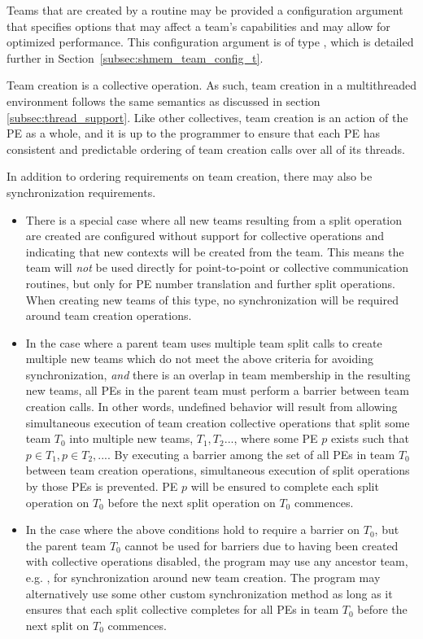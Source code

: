 Teams that are created by a  routine may be
provided a configuration argument that specifies options that may affect
a team's capabilities and may allow for optimized performance.
This configuration argument is of type , which
is detailed further in Section~\ref{subsec:shmem_team_config_t}.

Team creation is a collective operation. As such, team creation in a
multithreaded environment follows the same semantics as discussed in section
\ref{subsec:thread_support}. Like other collectives, team creation is an action
of the \ac{PE} as a whole, and it is up to the programmer to ensure that each
\ac{PE} has consistent and predictable ordering of team creation calls over
all of its threads.

In addition to ordering requirements on team creation, there may also be
synchronization requirements.
\begin{itemize}
\item There is a special case where all new teams resulting from a split operation are
created are configured without support for collective operations and indicating that  new contexts will be created from the team.
This means the team will \emph{not} be used
directly for point-to-point or collective communication routines, but only for
\ac{PE} number translation and further split operations. When creating new teams
of this type, no synchronization will be required around team creation operations.
\item In the case where a parent team uses multiple team split calls to create
multiple new teams which do not meet the above criteria for avoiding synchronization,
\emph{and} there is an overlap in team membership in the resulting new teams, all \acp{PE}
in the parent team must perform a barrier between team creation calls.
In other words, undefined behavior will result from allowing simultaneous execution of team
creation collective operations that split some team $T_0$ into multiple new
teams, $T_1, T_2...$, where some \ac{PE} $p$ exists such that $p \in T_1, p \in T_2, ...$.
By executing a barrier among the set of
all \acp{PE} in team $T_0$ between team creation operations, simultaneous execution
of split operations by those \acp{PE} is prevented. \ac{PE} $p$ will be ensured to
complete each split operation on $T_0$ before the next split operation on $T_0$ commences.
\item In the case where the above conditions hold to require a barrier on $T_0$,
but the parent team $T_0$ cannot be used for barriers due to having
been created with collective operations disabled, the program may use any
ancestor team, e.g. , for synchronization around new
team creation. The program may alternatively use some other custom synchronization method
as long as it ensures that each split collective completes for all \acp{PE}
in team $T_0$ before the next split on $T_0$ commences.
\end{itemize}

